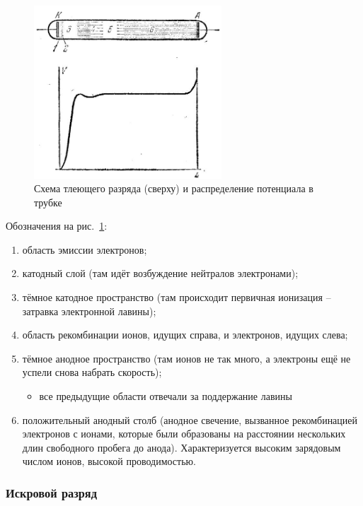 \documentclass[10pt, a4paper]{article}
\begin{document}
\begin{figure}[ht]
	\begin{center}
		\includegraphics[width=70mm]{12.1.JPG}
	\end{center}
	\caption{Схема тлеющего разряда (сверху) и распределение потенциала в трубке}
	\label{fig:glow_discharge}
\end{figure}

Обозначения на рис.~\ref{fig:glow_discharge}: 

\begin{enumerate}
	\item область эмиссии электронов;
	\item катодный слой (там идёт возбуждение нейтралов электронами);
	\item тёмное катодное пространство (там происходит первичная ионизация -- затравка электронной лавины);
	\item область рекомбинации ионов, идущих справа, и электронов, идущих слева;
	\item тёмное анодное пространство (там ионов не так много, а электроны ещё не успели снова набрать скорость);
	\begin{itemize}
		\item все предыдущие области отвечали за поддержание лавины
	\end{itemize}
	\item положительный анодный столб (анодное свечение, вызванное рекомбинацией электронов с ионами, которые были образованы на расстоянии нескольких длин свободного пробега до анода). Характеризуется высоким зарядовым числом ионов, высокой проводимостью.
\end{enumerate}

\subsubsection{Искровой разряд}
\end{document}
